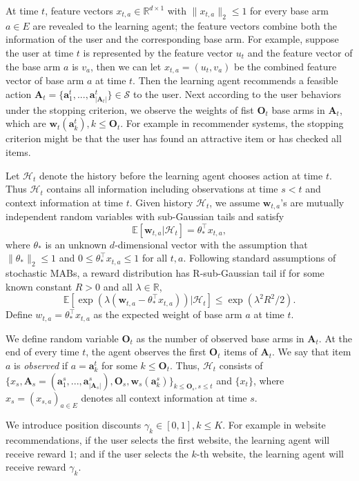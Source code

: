 \documentclass{article}
\newcommand{\EE}{\mathbb{E}}
\newcommand{\RR}{\mathbb{R}}
\newcommand{\bA}{\mathbf{A}}
\newcommand{\ba}{\mathbf{a}}
\newcommand{\bO}{\mathbf{O}}
\newcommand{\bw}{\mathbf{w}}
\newcommand{\cH}{\mathcal{H}}
\newcommand{\cS}{\mathcal{S}}
\newcommand{\abs}[1]{\left| #1 \right|}
\newcommand{\norm}[1]{\| #1 \|}
\begin{document}
At time $t$, feature vectors $x_{t,a} \in \RR^{d \times 1}$ with $\norm{x_{t,a}}_2 \leq 1$ for every base arm $a \in E$ are revealed to the learning agent; the feature vectors combine both the information of the user and the corresponding base arm. For example, suppose the user at time $t$ is represented by the feature vector $u_t$ and the feature vector of the base arm $a$ is $v_a$, then we can let $x_{t,a} = (u_t, v_a)$ be the combined feature vector of base arm $a$ at time $t$. Then the learning agent recommends a feasible action $\bA_t=\{ \ba_{1}^t,...,\ba_{\abs{\bA_t}}^t \} \in \cS$ to the user. Next according to the user behaviors under the stopping criterion, we observe the weights of fist $\bO_t$ base arms in $\bA_t$, which are $\bw_t(\ba_k^t), k \leq \bO_t$. For example in recommender systems, the stopping criterion might be that the user has found an attractive item or has checked all items.

Let $\cH_t$ denote the history before the learning agent chooses action at time $t$. Thus $\cH_t$ contains all information including observations at time $s < t$ and context information at time $t$. Given history $\cH_t$, we assume $\bw_{t,a}$'s are mutually independent random variables with sub-Gaussian tails and satisfy
\begin{equation} %
  \label{eq:expectation}
  \EE[\bw_{t,a} | \cH_t] = \theta_{\ast}^{\top} x_{t,a},
\end{equation}
where $\theta_{\ast}$ is an unknown $d$-dimensional vector with the assumption that $\norm{\theta_{\ast}}_2 \leq 1$ and $0 \leq \theta_{\ast}^{\top} x_{t,a} \leq 1$ for all $t, a$. Following standard assumptions of stochastic MABs, a reward distribution has R-sub-Gaussian tail if for some known constant $R > 0$ and all $\lambda \in \RR$, 
$$
\EE[\exp(\lambda(\bw_{t,a} - \theta_{\ast}^{\top} x_{t,a})) | \cH_t] \leq \exp(\lambda^2 R^2 / 2).
$$
Define $w_{t,a} = \theta_{\ast}^{\top} x_{t,a}$ as the expected weight of base arm $a$ at time $t$. 

We define random variable $\bO_t$ as the number of observed base arms in $\bA_t$. At the end of every time $t$, the agent observes the first $\bO_t$ items of $\bA_t$. We say that item $a$ is {\it observed} if $a = \ba_k^t$ for some $k \leq \bO_t$. Thus, $\cH_t$ consists of $\{x_s, \bA_s = (\ba_{1}^s,...,\ba_{\abs{\bA_s}}^s), \bO_s, \bw_s(\ba_k^s) \}_{k\leq \bO_s, s\leq t}$ and $\{x_t\}$, where $x_s = (x_{s,a})_{a \in E}$ denotes all context information at time $s$.

We introduce position discounts $\gamma_k \in [0,1], k\leq K$. For example in website recommendations, if the user selects the first website, the learning agent will receive reward $1$; and if the user selects the $k$-th website, the learning agent will receive reward $\gamma_k$.
\end{document}
